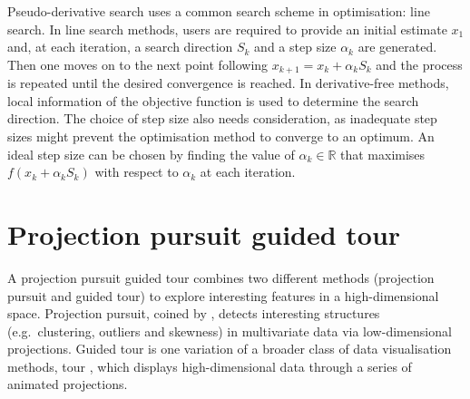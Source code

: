 Pseudo-derivative search uses a common search scheme in optimisation:
line search. In line search methods, users are required to provide an
initial estimate \(x_{1}\) and, at each iteration, a search direction
\(S_k\) and a step size \(\alpha_k\) are generated. Then one moves on to
the next point following \(x_{k+1} = x_k + \alpha_kS_k\) and the process
is repeated until the desired convergence is reached. In derivative-free
methods, local information of the objective function is used to
determine the search direction. The choice of step size also needs
consideration, as inadequate step sizes might prevent the optimisation
method to converge to an optimum. An ideal step size can be chosen by
finding the value of \(\alpha_k \in \mathbb{R}\) that maximises
\(f(x_k + \alpha_kS_k)\) with respect to \(\alpha_k\) at each iteration.

\hypertarget{projection-pursuit-guided-tour}{%
\section{Projection pursuit guided
tour}\label{projection-pursuit-guided-tour}}

A projection pursuit guided tour combines two different methods
(projection pursuit and guided tour) to explore interesting features in
a high-dimensional space. Projection pursuit, coined by
\citet{friedman1974projection}, detects interesting structures
(e.g.~clustering, outliers and skewness) in multivariate data via
low-dimensional projections. Guided tour \citep{cook1995grand} is one
variation of a broader class of data visualisation methods, tour
\citep{buja2005computational}, which displays high-dimensional data
through a series of animated projections.

